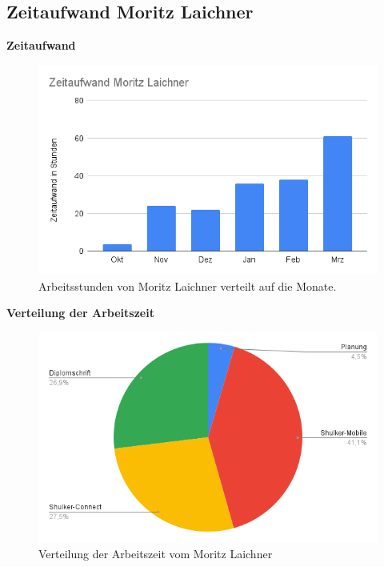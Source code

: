 \subsection{Zeitaufwand Moritz Laichner}
\textbf{Zeitaufwand}
\begin{figure}[H]
    \begin{center}
        \includegraphics[width=.75\textwidth]{images/appendix/ZeitaufwandLaichner.png}
        \caption{Arbeitsstunden von Moritz Laichner verteilt auf die Monate.}
    \end{center}
\end{figure}

\textbf{Verteilung der Arbeitszeit}
\begin{figure}[H]
    \begin{center}
        \includegraphics[width=.75\textwidth]{images/appendix/AufteilungLaichner.png}
        \caption{Verteilung der Arbeitszeit vom Moritz Laichner}
    \end{center}
\end{figure}